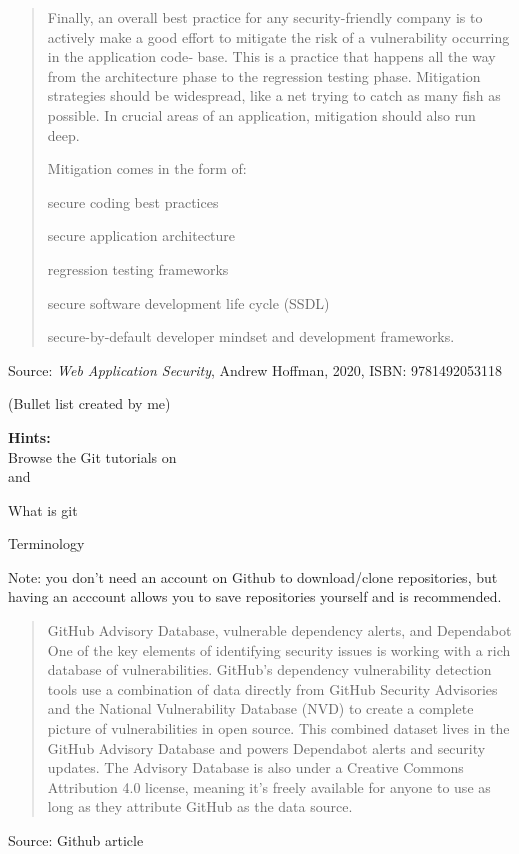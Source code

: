 \documentclass[Screen16to9,17pt]{foils}
\begin{document}
\begin{quote}
Finally, an overall best practice for any security-friendly company is to actively make
a good effort to mitigate the risk of a vulnerability occurring in the application code‐
base. This is a practice that happens all the way from the architecture phase to the
regression testing phase.
Mitigation strategies should be widespread, like a net trying to catch as many fish as possible. In crucial areas of an application, mitigation should also run deep.

Mitigation comes in the form of:
\begin{list2}
\item secure coding best practices
\item secure application architecture
\item regression testing frameworks
\item secure software development life cycle (SSDL)
\item secure-by-default developer mindset and development frameworks.
\end{list2}
\end{quote}

Source: \emph{Web Application Security}, Andrew Hoffman, 2020, ISBN: 9781492053118

(Bullet list created by me)


{\bf Hints:}\\
Browse the Git tutorials on \\
and 

\begin{list2}
\item What is git
\item Terminology
\end{list2}

Note: you don't need an account on Github to download/clone repositories, but having an acccount allows you to save repositories yourself and is recommended.



\begin{quote}\small
GitHub Advisory Database, vulnerable dependency alerts, and Dependabot
One of the key elements of identifying security issues is working with a rich database of vulnerabilities. GitHub’s dependency vulnerability detection tools use a combination of data directly from GitHub Security Advisories and the National Vulnerability Database (NVD) to create a complete picture of vulnerabilities in open source. This combined dataset lives in the GitHub Advisory Database and powers Dependabot alerts and security updates. The Advisory Database is also under a Creative Commons Attribution 4.0 license, meaning it’s freely available for anyone to use as long as they attribute GitHub as the data source.
\end{quote}
Source: Github article
\end{document}
